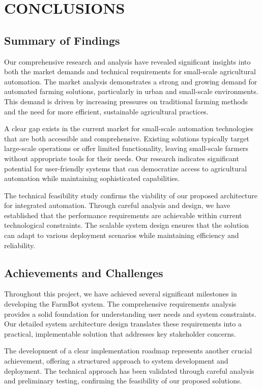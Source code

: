 \chapter*{CONCLUSIONS}

\section*{Summary of Findings}
Our comprehensive research and analysis have revealed significant insights into both the market demands and technical requirements for small-scale agricultural automation. The market analysis demonstrates a strong and growing demand for automated farming solutions, particularly in urban and small-scale environments. This demand is driven by increasing pressures on traditional farming methods and the need for more efficient, sustainable agricultural practices.

A clear gap exists in the current market for small-scale automation technologies that are both accessible and comprehensive. Existing solutions typically target large-scale operations or offer limited functionality, leaving small-scale farmers without appropriate tools for their needs. Our research indicates significant potential for user-friendly systems that can democratize access to agricultural automation while maintaining sophisticated capabilities.

The technical feasibility study confirms the viability of our proposed architecture for integrated automation. Through careful analysis and design, we have established that the performance requirements are achievable within current technological constraints. The scalable system design ensures that the solution can adapt to various deployment scenarios while maintaining efficiency and reliability.

\section*{Achievements and Challenges}
Throughout this project, we have achieved several significant milestones in developing the FarmBot system. The comprehensive requirements analysis provides a solid foundation for understanding user needs and system constraints. Our detailed system architecture design translates these requirements into a practical, implementable solution that addresses key stakeholder concerns.

The development of a clear implementation roadmap represents another crucial achievement, offering a structured approach to system development and deployment. The technical approach has been validated through careful analysis and preliminary testing, confirming the feasibility of our proposed solutions.

